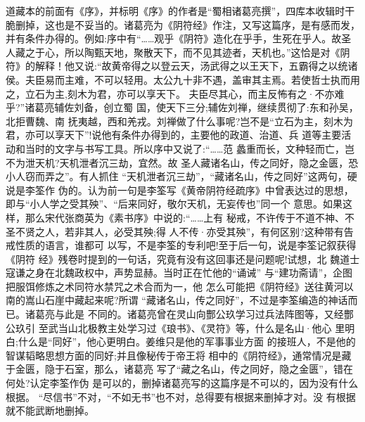 \documentclass[12pt,UTF8]{ctexbook}
\begin{document}
道藏本的前面有《序》，并标明《序》的作者是“蜀相诸葛亮撰”，四库本收辑时干脆删掉，这也是不妥当的。诸葛亮为《阴符经》作注，又写这篇序，是有感而发，并有条件办得的。例如:序中有“……观乎《阴符》造化在乎手，生死在乎人。故圣人藏之于心，所以陶甄天地，聚散天下，而不见其迹者，天机也。”这恰是对《阴符》的解释！他又说:“故黄帝得之以登云天，汤武得之以王天下，五霸得之以统诸侯。夫臣易而主难，不可以轻用。太公九十非不遇，盖审其主焉。若使哲士执而用之，立石为主,刻木为君，亦可以享天下。
夫臣尽其心，而主反怖有之·不亦难乎?”诸葛亮辅佐刘备，创立蜀
国，使天下三分;辅佐刘禅，继续贯彻了:东和孙吴，北拒曹魏、南
抚夷越，西和羌戎。刘禅做了什么事呢?岂不是“立石为主，刻木为
君，亦可以享天下”!说他有条件办得到的，主要他的政道、治道、兵
道等主要活动和当时的文字与书写工具。所以序中又说了:“……范
蠡重而长，文种轻而亡，岂不为泄天机?天机泄者沉三劫，宜然。故
圣人藏诸名山，传之同好，隐之金匮，恐小人窃而弄之”。有人抓住
“天机泄者沉三劫”，“藏诸名山，传之同好”这两句，硬说是李筌作
伪的。认为前一句是李筌写《黄帝阴符经疏序》中曾表达过的思想，
即与“小人学之受其殃”、“后来同好，敬尔天机，无妄传也”同一个
意思。如果这样，那么宋代张商英为《素书序》中说的:“……上有
秘戒，不许传于不道不神、不圣不贤之人，若非其人，必受其殃;得
人不传·亦受其殃”，有何区别?这种带有告戒性质的语言，谁都可
以写，不是李筌的专利吧!至于后一句，说是李筌记叙获得《阴符
经》残卷时提到的一句话，究竟有没有这回事还是问题呢!试想，北
魏道士寇谦之身在北魏政权中，声势显赫。当时正在忙他的“诵诫”
与“建功斋请”，企图把服饵修炼之术同符水禁咒之术合而为一，他
怎么可能把《阴符经》送往黄河以南的嵩山石崖中藏起来呢?所谓
“藏诸名山，传之同好”，不过是李筌编造的神话而已。诸葛亮与此是
不同的。诸葛亮曾在灵山向酆公玖学习过兵法阵图等，又经酆公玖引
至武当山北极教主处学习过《琅书》、《灵符》等，什么是名山·他心
里明白;什么是“同好”，他心更明白。姜维只是他的军事事业方面
的接班人，不是他的智谋韬略思想方面的同好;并且像秘传于帝王将
相中的《阴符经》，通常情况是藏于金匮，隐于石室，那么，诸葛亮
写了“藏之名山，传之同好，隐之金匮”，错在何处?认定李筌作伪
是可以的，删掉诸葛亮写的这篇序是不可以的，因为没有什么根据。
“尽信书”不对，“不如无书”也不对，总得要有根据来删掉才对。没
有根据就不能武断地删掉。
\end{document}
